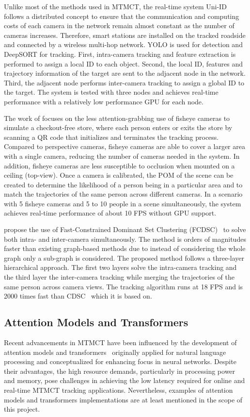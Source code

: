 Unlike most of the methods used in MTMCT, the real-time system Uni-ID~\cite{Chen22} follows a distributed concept to ensure that the communication and computing costs of each camera in the network remain almost constant as the number of cameras increases. Therefore, smart stations are installed on the tracked roadside and connected by a wireless multi-hop network. YOLO is used for detection and DeepSORT for tracking. First, intra-camera tracking and feature extraction is performed to assign a local ID to each object. Second, the local ID, features and trajectory information of the target are sent to the adjacent node in the network. Third, the adjacent node performs inter-camera tracking to assign a global ID to the target. The system is tested with three nodes and achieves real-time performance with a relatively low performance GPU for each node.

The work of \textcite{Wang21} focuses on the less attention-grabbing use of fisheye cameras to simulate a checkout-free store, where each person enters or exits the store by scanning a QR code that initializes and terminates the tracking process. Compared to perspective cameras, fisheye cameras are able to cover a larger area with a single camera, reducing the number of cameras needed in the system. In addition, fisheye cameras are less susceptible to occlusion when mounted on a ceiling (top-view). Once a camera is calibrated, the POM of the scene can be created to determine the likelihood of a person being in a particular area and to match the trajectories of the same person across different cameras. In a scenario with 5 fisheye cameras and 5 to 10 people in a scene simultaneously, the system achieves real-time performance of about 10 FPS without GPU support.

\citeauthor{Tesfaye19} propose the use of Fast-Constrained Dominant Set Clustering (FCDSC)~\cite{Tesfaye19} to solve both intra- and inter-camera simultaneously. The method is orders of magnitudes faster than existing graph-based methods due to instead of considering the whole graph only a sub-graph is considered. The proposed method follows a three-layer hierarchical approach. The first two layers solve the intra-camera tracking and the third layer the inter-camera tracking while merging the trajectories of the same person across camera views. The tracking algorithm runs at 18 FPS and is 2000 times fast than CDSC~\cite{Zemene16} which it is based on.

\subsection{Attention Models and Transformers}\label{subsec:attention_models_and_transformers}
Recent advancements in MTMCT have been influenced by the development of attention models and transformers~\cite{Vaswani17} originally applied for natural language processing and conceptualized for enhancing focus in neural networks. Despite their advantages, the high resource demands, particularly in processing power and memory, pose challenges in achieving the low latency required for online and real-time MTMCT tracking applications. Nevertheless, examples of attention models and transformers implementations are at least mentioned in the scope of this project.

